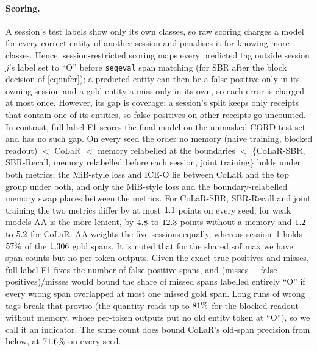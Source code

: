 \paragraph{Scoring.} A session's test labels show only its own classes, so raw scoring charges a model for every correct entity of another session and penalises it for knowing more classes. Hence, session-restricted scoring maps every predicted tag outside session $j$'s label set to ``O'' before \texttt{seqeval} span matching (for SBR after the block decision of \cref{eq:infer}); a predicted entity can then be a false positive only in its owning session and a gold entity a miss only in its own, so each error is charged at most once. However, its gap is coverage: a session's split keeps only receipts that contain one of its entities, so false positives on other receipts go uncounted. In contrast, full-label F1 scores the final model on the unmasked CORD test set and has no such gap. On every seed the order no memory (naive training, blocked readout) $<$ CoLaR $<$ memory relabelled at the boundaries $<$ \{CoLaR-SBR, SBR-Recall, memory relabelled before each session, joint training\} holds under both metrics; the MiB-style loss and ICE-O lie between CoLaR and the top group under both, and only the MiB-style loss and the boundary-relabelled memory swap places between the metrics. For CoLaR-SBR, SBR-Recall and joint training the two metrics differ by at most $1.1$ points on every seed; for weak models AA is the more lenient, by $4.8$ to $12.3$ points without a memory and $1.2$ to $5.2$ for CoLaR. AA weights the five sessions equally, whereas session~1 holds $57\%$ of the $1{,}306$ gold spans. It is noted that for the shared softmax we have span counts but no per-token outputs. Given the exact true positives and misses, full-label F1 fixes the number of false-positive spans, and (misses $-$ false positives)/misses would bound the share of missed spans labelled entirely ``O'' if every wrong span overlapped at most one missed gold span. Long runs of wrong tags break that proviso (the quantity reads up to $81\%$ for the blocked readout without memory, whose per-token outputs put no old entity token at ``O''), so we call it an indicator. The same count does bound CoLaR's old-span precision from below, at $71.6\%$ on every seed.

